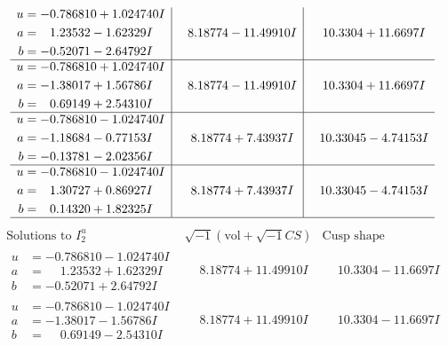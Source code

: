 \documentclass[1p]{elsarticle_modified}
\theoremstyle{definition}
\newcommand{\I}{\sqrt{-1}}
\begin{document}
$$\begin{array}{c|c|c}
\begin{aligned}
u &= -0.786810 + 1.024740 I \\
a &= \phantom{-}1.23532 - 1.62329 I \\
b &= -0.52071 - 2.64792 I\end{aligned}
 & \phantom{-}8.18774 - 11.49910 I & \phantom{-}10.3304 + 11.6697 I \\ \hline\begin{aligned}
u &= -0.786810 + 1.024740 I \\
a &= -1.38017 + 1.56786 I \\
b &= \phantom{-}0.69149 + 2.54310 I\end{aligned}
 & \phantom{-}8.18774 - 11.49910 I & \phantom{-}10.3304 + 11.6697 I \\ \hline\begin{aligned}
u &= -0.786810 - 1.024740 I \\
a &= -1.18684 - 0.77153 I \\
b &= -0.13781 - 2.02356 I\end{aligned}
 & \phantom{-}8.18774 + 7.43937 I & \phantom{-}10.33045 - 4.74153 I \\ \hline\begin{aligned}
u &= -0.786810 - 1.024740 I \\
a &= \phantom{-}1.30727 + 0.86927 I \\
b &= \phantom{-}0.14320 + 1.82325 I\end{aligned}
 & \phantom{-}8.18774 + 7.43937 I & \phantom{-}10.33045 - 4.74153 I\\
 \hline 
 \end{array}$$\newpage$$\begin{array}{c|c|c}  
\text{Solutions to }I^u_{2}& \I (\text{vol} + \sqrt{-1}CS) & \text{Cusp shape}\\
 \hline 
\begin{aligned}
u &= -0.786810 - 1.024740 I \\
a &= \phantom{-}1.23532 + 1.62329 I \\
b &= -0.52071 + 2.64792 I\end{aligned}
 & \phantom{-}8.18774 + 11.49910 I & \phantom{-}10.3304 - 11.6697 I \\ \hline\begin{aligned}
u &= -0.786810 - 1.024740 I \\
a &= -1.38017 - 1.56786 I \\
b &= \phantom{-}0.69149 - 2.54310 I\end{aligned}
 & \phantom{-}8.18774 + 11.49910 I & \phantom{-}10.3304 - 11.6697 I \\ \hline\begin{aligned}

\end{aligned}
\end{array}$$
\end{document}
